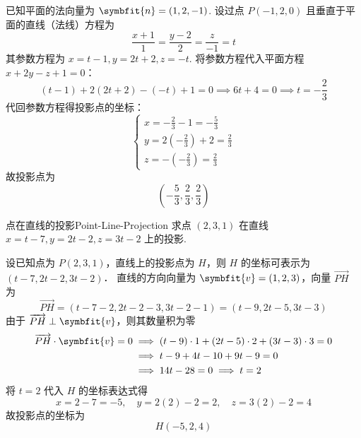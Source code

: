 \begin{solution}
    已知平面的法向量为 $\symbfit{n} = (1, 2, -1)$.
    设过点 $P(-1, 2, 0)$ 且垂直于平面的直线（法线）方程为
    \begin{equation}
        \frac{x + 1}{1} = \frac{y - 2}{2} = \frac{z}{-1} = t
    \end{equation}
    其参数方程为 $x = t - 1, y = 2t + 2, z = -t$.
    将参数方程代入平面方程 $x + 2y - z + 1 = 0$：
    \begin{equation}
        (t - 1) + 2(2t + 2) - (-t) + 1 = 0 \implies 6t + 4 = 0 \implies t = -\frac{2}{3}
    \end{equation}
    代回参数方程得投影点的坐标：
    \begin{equation}
        \begin{cases} x = -\frac{2}{3} - 1 = -\frac{5}{3} \\ y = 2(-\frac{2}{3}) + 2 = \frac{2}{3} \\ z = -(-\frac{2}{3}) = \frac{2}{3} \end{cases}
    \end{equation}
    故投影点为
    \begin{equation}
        \boxed{\left( -\frac{5}{3}, \frac{2}{3}, \frac{2}{3} \right)}
    \end{equation}
\end{solution}


\begin{problem}{点在直线的投影}{Point-Line-Projection}
    求点 $(2, 3, 1)$ 在直线 $x = t - 7, y = 2t - 2, z = 3t - 2$ 上的投影.
\end{problem}

\begin{solution}
    设已知点为 $P(2, 3, 1)$，直线上的投影点为 $H$，则 $H$ 的坐标可表示为 $(t - 7, 2t - 2, 3t - 2)$．
    直线的方向向量为 $\symbfit{v} = (1, 2, 3)$，向量 $\overrightarrow{PH}$ 为
    \begin{equation}
        \overrightarrow{PH} = (t - 7 - 2, 2t - 2 - 3, 3t - 2 - 1) = (t - 9, 2t - 5, 3t - 3)
    \end{equation}
    由于 $\overrightarrow{PH} \perp \symbfit{v}$，则其数量积为零
    \begin{equation}
        \begin{aligned}
            \overrightarrow{PH} \cdot \symbfit{v} = 0
             & \implies (t - 9) \cdot 1 + (2t - 5) \cdot 2 + (3t - 3) \cdot 3 = 0 \\
             & \implies t - 9 + 4t - 10 + 9t - 9 = 0                              \\
             & \implies 14t - 28 = 0 \implies t = 2
        \end{aligned}
    \end{equation}
    将 $t = 2$ 代入 $H$ 的坐标表达式得
    \begin{equation}
        x = 2 - 7 = -5, \quad y = 2(2) - 2 = 2, \quad z = 3(2) - 2 = 4
    \end{equation}
    故投影点的坐标为
    \begin{equation}
        \boxed{H(-5, 2, 4)}
    \end{equation}
\end{solution}


